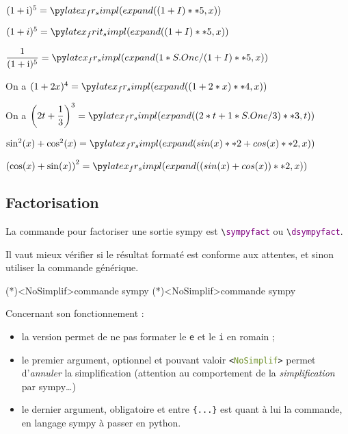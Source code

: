 \documentclass[french,a4paper,11pt]{article}
\newcommand\Cle[1]{{\bfseries\sffamily\textlangle #1\textrangle}}
\begin{document}
\begin{bloctext}
$(1+\text{i})^5 = \sympydev{(1+I)**5}$          %

$(1+i)^5 = \sympydev*{(1+I)**5}$

$\dfrac{1}{(1+\text{i})^5} = \dsympydev{1/(1+I)**5}$
\end{bloctext}

\begin{bloctext}
On a $(1+2x)^4 = \sympydev{(1+2*x)**4}$

On a $\left(2t+\dfrac13\right)^3 = \dsympydev{(2*t+1/3)**3}[t]$
\end{bloctext}

\begin{bloctext}
$\sin^2(x)+\cos^2(x) = \dsympydev{sin(x)**2+cos(x)**2}$

$\left(\cos(x)+\sin(x)\right)^2 = \dsympydev{(sin(x)+cos(x))**2}$
\end{bloctext}

\subsection{Factorisation}

\begin{cautionblock}
La commande pour factoriser une sortie \textsf{sympy} est \texttt{\textbackslash \textcolor{purple}{sympyfact}} ou \texttt{\textbackslash \textcolor{purple}{dsympyfact}}.

Il vaut mieux vérifier si le résultat formaté est conforme aux attentes, et sinon utiliser la commande générique.
\end{cautionblock}

\begin{bloctext}
\sympyfact(*)<NoSimplif>{commande sympy}
\dsympyfact(*)<NoSimplif>{commande sympy}
\end{bloctext}

\begin{tipblock}
Concernant son fonctionnement :

\begin{itemize}
	\item la version \Cle{*} permet de ne pas formater le \texttt{e} et le \texttt{i} en \textsf{romain} ;
	\item le premier argument, optionnel et pouvant valoir \texttt{<\textcolor{OliveDrab}{NoSimplif}>} permet d'\textit{annuler} la simplification (attention au comportement de la \textit{simplification} par \textsf{sympy}\ldots)
	\item le dernier argument, obligatoire et entre \texttt{\{...\}} est quant à lui la commande, en langage \textsf{sympy} à passer en \textsf{python}.
\end{itemize}
\vspace*{-\baselineskip}\leavevmode
\end{tipblock}
\end{document}
